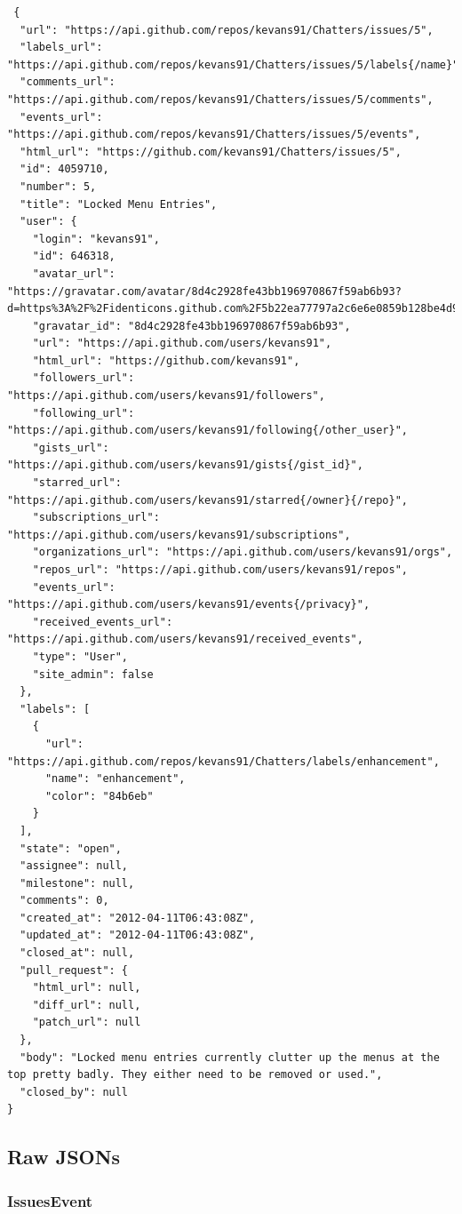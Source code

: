 \documentclass[a4paper,10pt]{article}
\begin{document}
\begin{lstlisting}
 {
  "url": "https://api.github.com/repos/kevans91/Chatters/issues/5",
  "labels_url": "https://api.github.com/repos/kevans91/Chatters/issues/5/labels{/name}",
  "comments_url": "https://api.github.com/repos/kevans91/Chatters/issues/5/comments",
  "events_url": "https://api.github.com/repos/kevans91/Chatters/issues/5/events",
  "html_url": "https://github.com/kevans91/Chatters/issues/5",
  "id": 4059710,
  "number": 5,
  "title": "Locked Menu Entries",
  "user": {
    "login": "kevans91",
    "id": 646318,
    "avatar_url": "https://gravatar.com/avatar/8d4c2928fe43bb196970867f59ab6b93?d=https%3A%2F%2Fidenticons.github.com%2F5b22ea77797a2c6e6e0859b128be4d94.png&r=x",
    "gravatar_id": "8d4c2928fe43bb196970867f59ab6b93",
    "url": "https://api.github.com/users/kevans91",
    "html_url": "https://github.com/kevans91",
    "followers_url": "https://api.github.com/users/kevans91/followers",
    "following_url": "https://api.github.com/users/kevans91/following{/other_user}",
    "gists_url": "https://api.github.com/users/kevans91/gists{/gist_id}",
    "starred_url": "https://api.github.com/users/kevans91/starred{/owner}{/repo}",
    "subscriptions_url": "https://api.github.com/users/kevans91/subscriptions",
    "organizations_url": "https://api.github.com/users/kevans91/orgs",
    "repos_url": "https://api.github.com/users/kevans91/repos",
    "events_url": "https://api.github.com/users/kevans91/events{/privacy}",
    "received_events_url": "https://api.github.com/users/kevans91/received_events",
    "type": "User",
    "site_admin": false
  },
  "labels": [
    {
      "url": "https://api.github.com/repos/kevans91/Chatters/labels/enhancement",
      "name": "enhancement",
      "color": "84b6eb"
    }
  ],
  "state": "open",
  "assignee": null,
  "milestone": null,
  "comments": 0,
  "created_at": "2012-04-11T06:43:08Z",
  "updated_at": "2012-04-11T06:43:08Z",
  "closed_at": null,
  "pull_request": {
    "html_url": null,
    "diff_url": null,
    "patch_url": null
  },
  "body": "Locked menu entries currently clutter up the menus at the top pretty badly. They either need to be removed or used.",
  "closed_by": null
}
\end{lstlisting}

\subsection{Raw JSONs}
\subsubsection{IssuesEvent}
\end{document}
